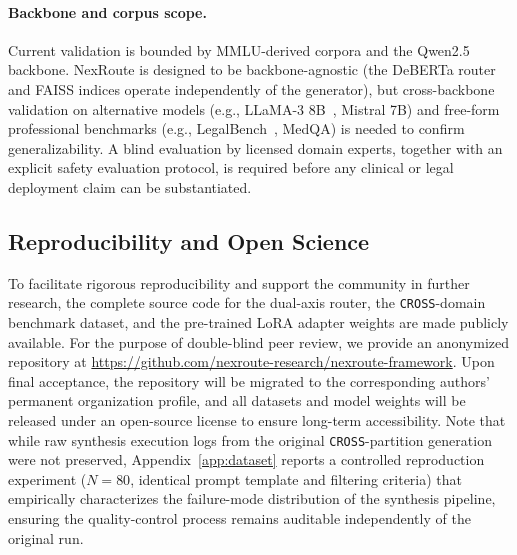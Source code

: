 \documentclass[a4paper,fleql]{cas-sc}
\begin{document}
\paragraph{Backbone and corpus scope.}
Current validation is bounded by MMLU-derived corpora and the Qwen2.5
backbone. NexRoute is designed to be backbone-agnostic (the DeBERTa router
and FAISS indices operate independently of the generator), but cross-backbone
validation on alternative models (e.g., LLaMA-3 8B~\citep{grattafiori2024llama3},
Mistral 7B) and free-form professional benchmarks (e.g.,
LegalBench~\citep{guha2023legalbench}, MedQA) is needed to confirm
generalizability. A blind evaluation by licensed domain experts, together
with an explicit safety evaluation protocol, is required before any clinical
or legal deployment claim can be substantiated.
\subsection{Reproducibility and Open Science}
\label{sec:reproducibility}
To facilitate rigorous reproducibility and support the community in further
research, the complete source code for the dual-axis router, the
\texttt{CROSS}-domain benchmark dataset, and the pre-trained LoRA adapter
weights are made publicly available. For the purpose of double-blind peer
review, we provide an anonymized repository at
\url{https://github.com/nexroute-research/nexroute-framework}. Upon final
acceptance, the repository will be migrated to the corresponding authors'
permanent organization profile, and all datasets and model weights will be
released under an open-source license to ensure long-term accessibility.
Note that while raw synthesis execution logs from the original
\texttt{CROSS}-partition generation were not preserved, Appendix~\ref{app:dataset}
reports a controlled reproduction experiment ($N{=}80$, identical prompt
template and filtering criteria) that empirically characterizes the
failure-mode distribution of the synthesis pipeline, ensuring the
quality-control process remains auditable independently of the original run.

\end{document}
